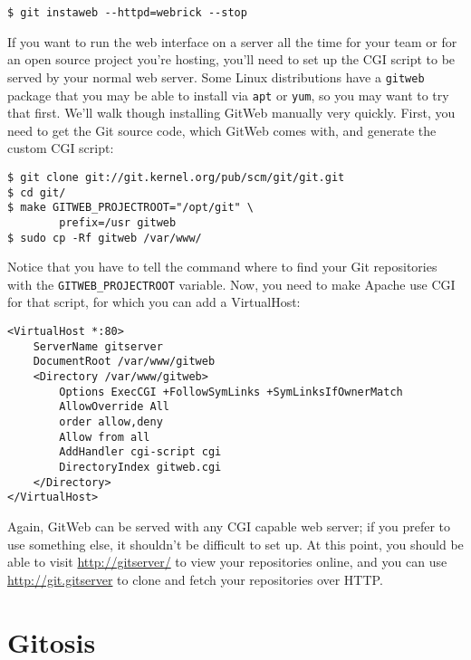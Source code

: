 \documentclass[a4paper]{book}
\begin{document}
\begin{shaded}\begin{verbatim}
$ git instaweb --httpd=webrick --stop
\end{verbatim}\end{shaded}

If you want to run the web interface on a server all the time for your team or for an open source project you're hosting, you'll need to set up the CGI script to be served by your normal web server. Some Linux distributions have a \texttt{gitweb} package that you may be able to install via \texttt{apt} or \texttt{yum}, so you may want to try that first. We'll walk though installing GitWeb manually very quickly. First, you need to get the Git source code, which GitWeb comes with, and generate the custom CGI script:

\begin{shaded}\begin{verbatim}
$ git clone git://git.kernel.org/pub/scm/git/git.git
$ cd git/
$ make GITWEB_PROJECTROOT="/opt/git" \
        prefix=/usr gitweb
$ sudo cp -Rf gitweb /var/www/
\end{verbatim}\end{shaded}

Notice that you have to tell the command where to find your Git repositories with the \texttt{GITWEB\_PROJECTROOT} variable. Now, you need to make Apache use CGI for that script, for which you can add a VirtualHost:

\begin{shaded}\begin{verbatim}
<VirtualHost *:80>
    ServerName gitserver
    DocumentRoot /var/www/gitweb
    <Directory /var/www/gitweb>
        Options ExecCGI +FollowSymLinks +SymLinksIfOwnerMatch
        AllowOverride All
        order allow,deny
        Allow from all
        AddHandler cgi-script cgi
        DirectoryIndex gitweb.cgi
    </Directory>
</VirtualHost>
\end{verbatim}\end{shaded}

Again, GitWeb can be served with any CGI capable web server; if you prefer to use something else, it shouldn't be difficult to set up. At this point, you should be able to visit \url{http://gitserver/} to view your repositories online, and you can use \url{http://git.gitserver} to clone and fetch your repositories over HTTP.

\section{Gitosis}
\end{document}
